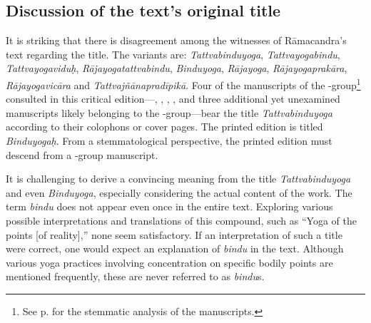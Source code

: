 \subsection{Discussion of the text's original title}
\label{titlediscussion}
It is striking that there is disagreement among the witnesses of Rāmacandra's text regarding the title. The variants are: \emph{Tattvabinduyoga}, \emph{Tattvayogabindu}, \emph{Tattvayogaviduḥ}, \emph{Rājayogatattvabindu}, \emph{Binduyoga}, \emph{Rājayoga}, \emph{Rājayogaprakāra}, \emph{Rājayogavicāra} and \emph{Tattvajñānapradīpikā}. Four of the manuscripts of the \beta-group\footnote{See p. \pageref{stemma} for the stemmatic analysis of the manuscripts.} consulted in this critical edition—, , , , and three additional yet unexamined manuscripts likely belonging to the \beta-group—bear the title \emph{Tattvabinduyoga} according to their colophons or cover pages. The printed edition  is titled \emph{Binduyogaḥ}. From a stemmatological perspective, the printed edition  must descend from a \beta-group manuscript. 

It is challenging to derive a convincing meaning from the title \emph{Tattvabinduyoga} and even \emph{Binduyoga}, especially considering the actual content of the work. The term \textit{bindu} does not appear even once in the entire text. Exploring various possible interpretations and translations of this compound, such as ``Yoga of the points [of reality],'' none seem satisfactory. If an interpretation of such a title were correct, one would expect an explanation of \textit{bindu} in the text. Although various yoga practices involving concentration on specific bodily points are mentioned frequently, these are never referred to as \textit{bindu}s.

